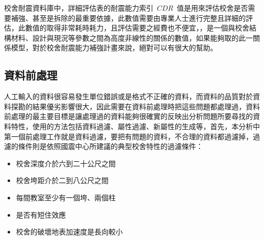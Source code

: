 校舍耐震資料庫中，詳細評估表的耐震能力索引~$CDR$~值是用來評估校舍是否需要補強、甚至是拆除的最重要依據，此數值需要由專業人士進行完整且詳細的評估，此數值的取得非常耗時耗力，且評估需要之經費也不便宜，，是一個與校舍結構材料、設計與現況等參數之間為高度非線性的關係的數值，如果能夠取的此一關係模型，對於校舍耐震能力補強計畫來說，絕對可以有很大的幫助。

\subsection{資料前處理}

人工輸入的資料很容易發生單位錯誤或是格式不正確的資料，而資料的品質對於資料探勘的結果優劣影響很大，因此需要在資料前處理時把這些問題都處理過，資料前處理的最主要目標是讓處理過的資料能夠很確實的反映出分析問題所要尋找的資料特性，使用的方法包括資料過濾、屬性過濾、新屬性的生成等，首先，本分析中第一個前處理工作就是資料過濾，要把有問題的資料，不合理的資料都過濾掉，過濾的條件則是依照國震中心所建議的典型校舍特性的過濾條件：


\begin{itemize}
\item 校舍深度介於六到二十公尺之間
\item 校舍垮距介於二到八公尺之間
\item 每間教室至少有一個垮、兩個柱
\item 是否有短住效應 %
\item 校舍的破壞地表加速度是長向較小
\end{itemize}


